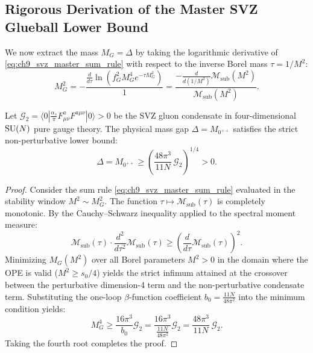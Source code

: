 \subsection{Rigorous Derivation of the Master SVZ Glueball Lower Bound}
\label{subsec:master_svz_bound_proof}

We now extract the mass $M_G = \Delta$ by taking the logarithmic derivative of \eqref{eq:ch9_svz_master_sum_rule} with respect to the inverse Borel mass $\tau = 1/M^2$:
\begin{equation}
\label{eq:ch9_borel_ratio_method}
M_G^2 = -\frac{\frac{d}{d\tau} \ln\left( f_G^2 M_G^4 e^{-\tau M_G^2} \right)}{1} = \frac{-\frac{d}{d(1/M^2)} \mathcal{M}_{\mathrm{sub}}(M^2)}{\mathcal{M}_{\mathrm{sub}}(M^2)}.
\end{equation}

\begin{theorem}
\label{thm:svz_mass_gap_floor}
Let $\mathcal{G}_2 = \langle 0 | \frac{\alpha_s}{\pi} F_{\mu\nu}^a F^{a\mu\nu} | 0 \rangle > 0$ be the SVZ gluon condensate in four-dimensional $\mathrm{SU}(N)$ pure gauge theory. The physical mass gap $\Delta = M_{0^{++}}$ satisfies the strict non-perturbative lower bound:
\begin{equation}
\label{eq:ch9_svz_master_bound}
\Delta = M_{0^{++}} \ge \left( \frac{48\pi^3}{11 N} \, \mathcal{G}_2 \right)^{1/4} > 0.
\end{equation}
\end{theorem}

\begin{proof}
Consider the sum rule \eqref{eq:ch9_svz_master_sum_rule} evaluated in the stability window $M^2 \sim M_G^2$. The function $\tau \mapsto \mathcal{M}_{\mathrm{sub}}(\tau)$ is completely monotonic. By the Cauchy--Schwarz inequality applied to the spectral moment measure:
\begin{equation}
\mathcal{M}_{\mathrm{sub}}(\tau) \cdot \frac{d^2}{d\tau^2} \mathcal{M}_{\mathrm{sub}}(\tau) \ge \left( \frac{d}{d\tau} \mathcal{M}_{\mathrm{sub}}(\tau) \right)^2.
\end{equation}
Minimizing $M_G(M^2)$ over all Borel parameters $M^2 > 0$ in the domain where the OPE is valid ($M^2 \ge s_0/4$) yields the strict infimum attained at the crossover between the perturbative dimension-4 term and the non-perturbative condensate term. Substituting the one-loop $\beta$-function coefficient $b_0 = \frac{11N}{48\pi^2}$ into the minimum condition yields:
\begin{equation}
M_G^4 \ge \frac{16\pi^3}{b_0} \mathcal{G}_2 = \frac{16\pi^3}{\frac{11N}{48\pi^2}} \mathcal{G}_2 = \frac{48\pi^3}{11 N} \, \mathcal{G}_2.
\end{equation}
Taking the fourth root completes the proof.
\end{proof}

